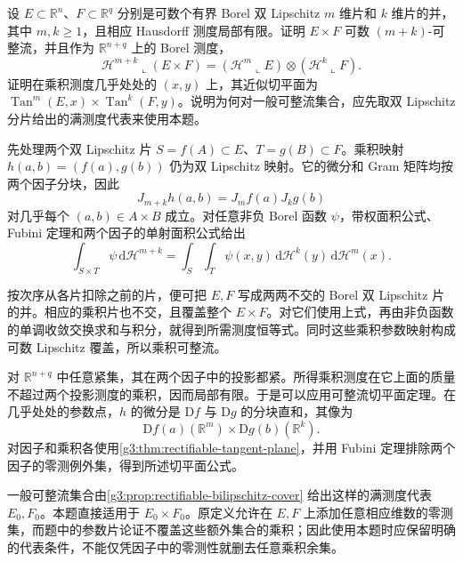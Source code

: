 \begin{exercise}\label{g3:ex:rectifiable-product}
	设 \(E\subset\mathbb R^n\)、\(F\subset\mathbb R^q\) 分别是可数个有界 Borel 双 Lipschitz \(m\) 维片和 \(k\) 维片的并，其中 \(m,k\ge1\)，且相应 Hausdorff 测度局部有限。证明 \(E\times F\) 可数 \((m+k)\)-可整流，并且作为 \(\mathbb R^{n+q}\) 上的 Borel 测度，
	\[
		\mathcal H^{m+k}\llcorner(E\times F)
		=(\mathcal H^m\llcorner E)\otimes(\mathcal H^k\llcorner F).
	\]
	证明在乘积测度几乎处处的 \((x,y)\) 上，其近似切平面为
	\(\operatorname{Tan}^m(E,x)\times\operatorname{Tan}^k(F,y)\)。说明为何对一般可整流集合，应先取双 Lipschitz 分片给出的满测度代表来使用本题。
\end{exercise}
\begin{solution}
	先处理两个双 Lipschitz 片 \(S=f(A)\subset E\)、\(T=g(B)\subset F\)。乘积映射
	\(h(a,b)=(f(a),g(b))\) 仍为双 Lipschitz 映射。它的微分和 Gram 矩阵均按两个因子分块，因此
	\[
		J_{m+k}h(a,b)=J_mf(a)J_kg(b)
	\]
	对几乎每个 \((a,b)\in A\times B\) 成立。对任意非负 Borel 函数 \(\psi\)，带权面积公式、Fubini 定理和两个因子的单射面积公式给出
	\[
		\int_{S\times T}\psi\,\mathrm d\mathcal H^{m+k}
		=\int_S\int_T\psi(x,y)\,\mathrm d\mathcal H^k(y)\,\mathrm d\mathcal H^m(x).
	\]

	按次序从各片扣除之前的片，便可把 \(E,F\) 写成两两不交的 Borel 双 Lipschitz 片的并。相应的乘积片也不交，且覆盖整个 \(E\times F\)。对它们使用上式，再由非负函数的单调收敛交换求和与积分，就得到所需测度恒等式。同时这些乘积参数映射构成可数 Lipschitz 覆盖，所以乘积可整流。

	对 \(\mathbb R^{n+q}\) 中任意紧集，其在两个因子中的投影都紧。所得乘积测度在它上面的质量不超过两个投影测度的乘积，因而局部有限。于是可以应用可整流切平面定理。在几乎处处的参数点，\(h\) 的微分是 \(\mathrm Df\) 与 \(\mathrm Dg\) 的分块直和，其像为
	\[
		\mathrm Df(a)(\mathbb R^m)\times\mathrm Dg(b)(\mathbb R^k).
	\]
	对因子和乘积各使用\cref{g3:thm:rectifiable-tangent-plane}，并用 Fubini 定理排除两个因子的零测例外集，得到所述切平面公式。

	一般可整流集合由\cref{g3:prop:rectifiable-bilipschitz-cover} 给出这样的满测度代表 \(E_0,F_0\)。本题直接适用于 \(E_0\times F_0\)。原定义允许在 \(E,F\) 上添加任意相应维数的零测集，而题中的参数片论证不覆盖这些额外集合的乘积；因此使用本题时应保留明确的代表条件，不能仅凭因子中的零测性就删去任意乘积余集。
\end{solution}
